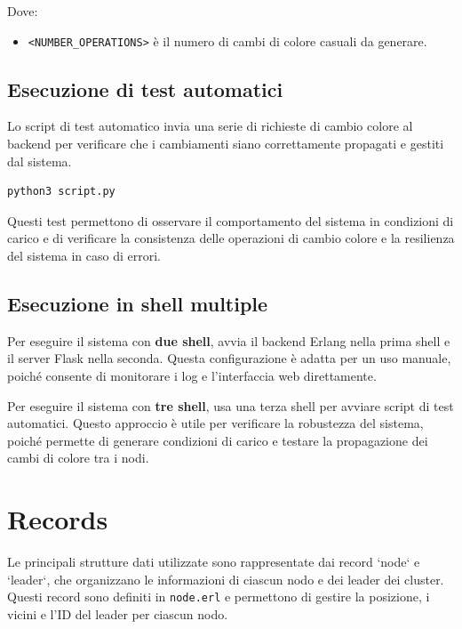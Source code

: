 \documentclass[12pt, a4paper]{report}
\begin{document}
\noindent Dove:
\begin{itemize}
    \item \texttt{<NUMBER\_OPERATIONS>} \`e il numero di cambi di colore casuali da generare.
\end{itemize}

\subsection{Esecuzione di test automatici}
Lo script di test automatico invia una serie di richieste di cambio colore al backend per verificare che i cambiamenti siano correttamente propagati e gestiti dal sistema.

\begin{tcolorbox}[title=Esecuzione di test automatici]
\begin{verbatim}
python3 script.py
\end{verbatim}
\end{tcolorbox}

\noindent Questi test permettono di osservare il comportamento del sistema in condizioni di carico e di verificare la consistenza delle operazioni di cambio colore e la resilienza del sistema in caso di errori.

\subsection{Esecuzione in shell multiple}
Per eseguire il sistema con \textbf{due shell}, avvia il backend Erlang nella prima shell e il server Flask nella seconda. Questa configurazione \`e adatta per un uso manuale, poiché consente di monitorare i log e l’interfaccia web direttamente.

Per eseguire il sistema con \textbf{tre shell}, usa una terza shell per avviare script di test automatici. Questo approccio \`e utile per verificare la robustezza del sistema, poiché permette di generare condizioni di carico e testare la propagazione dei cambi di colore tra i nodi.

\section{Records}

Le principali strutture dati utilizzate sono rappresentate dai record `node` e `leader`, che organizzano le informazioni di ciascun nodo e dei leader dei cluster. Questi record sono definiti in \texttt{node.erl} e permettono di gestire la posizione, i vicini e l'ID del leader per ciascun nodo.
\end{document}
